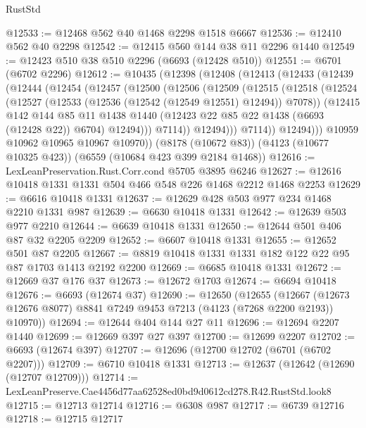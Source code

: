 \begin{lexlean}{RustStd}
\begin{coremodule}
@12533 := @12468 @562 @40 @1468 @2298 @1518 @6667
@12536 := @12410 @562 @40 @2298
@12542 := @12415 @560 @144 @38 @11 @2296 @1440
@12549 := @12423 @510 @38 @510 @2296 (@6693 (@12428 @510))
@12551 := @6701 (@6702 @2296)
@12612 := @10435
    (@12398
      (@12408
        (@12413
          (@12433
            (@12439
              (@12444
                (@12454
                  (@12457
                    (@12500
                      (@12506
                        (@12509
                          (@12515
                            (@12518
                              (@12524
                                (@12527 (@12533 (@12536 (@12542 (@12549 @12551) @12494)) @7078))
                                (@12415
                                  @142
                                  @144
                                  @85
                                  @11
                                  @1438
                                  @1440
                                  (@12423 @22 @85 @22 @1438 (@6693 (@12428 @22)) @6704)
                                  @12494)))
                            @7114))
                        @12494)))
                  @7114))
              @12494)))
        @10959
        @10962
        @10965
        @10967
        @10970))
    (@8178 (@10672 @83))
    (@4123 (@10677 @10325 @423))
    (@6559 (@10684 @423 @399 @2184 @1468))
@12616 := LexLeanPreservation.Rust.Corr.cond @5705 @3895 @6246
@12627 := @12616 @10418 @1331 @1331 @504 @466 @548 @226 @1468 @2212 @1468 @2253
@12629 := @6616 @10418 @1331
@12637 := @12629 @428 @503 @977 @234 @1468 @2210 @1331 @987
@12639 := @6630 @10418 @1331
@12642 := @12639 @503 @977 @2210
@12644 := @6639 @10418 @1331
@12650 := @12644 @501 @406 @87 @32 @2205 @2209
@12652 := @6607 @10418 @1331
@12655 := @12652 @501 @87 @2205
@12667 := @8819 @10418 @1331 @1331 @182 @122 @22 @95 @87 @1703 @1413 @2192 @2200
@12669 := @6685 @10418 @1331
@12672 := @12669 @37 @176 @37
@12673 := @12672 @1703
@12674 := @6694 @10418
@12676 := @6693 (@12674 @37)
@12690 := @12650
    (@12655
      (@12667 (@12673 @12676 @8077) @8841 @7249 @9453 @7213 (@4123 (@7268 @2200 @2193)) @10970))
@12694 := @12644 @404 @144 @27 @11
@12696 := @12694 @2207 @1440
@12699 := @12669 @397 @27 @397
@12700 := @12699 @2207
@12702 := @6693 (@12674 @397)
@12707 := @12696 (@12700 @12702 (@6701 (@6702 @2207)))
@12709 := @6710 @10418 @1331
@12713 := @12637 (@12642 (@12690 (@12707 @12709)))
@12714 := LexLeanPreserve.Cae4456d77aa62528ed0bd9d0612cd278.R42.RustStd.look8
@12715 := @12713 @12714
@12716 := @6308 @987
@12717 := @6739 @12716
@12718 := @12715 @12717

\end{coremodule}
\end{lexlean}

